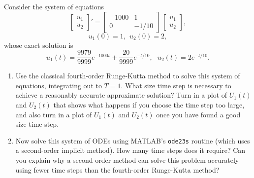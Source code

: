 \documentclass[10pt]{article}
\begin{document}
\begin{problem}[Problem 5]
Consider the system of equations
\[
\left[ \begin{array}{c} u_1 \\ u_2 \end{array} \right]' =
\left[ \begin{array}{cc} -1000 & 1 \\ 0 & -1/10 \end{array} \right]~
\left[ \begin{array}{c} u_1 \\ u_2 \end{array} \right] ,
\]
\[
u_1 (0) = 1 ,~~u_2 (0) = 2 ,
\]
whose exact solution is
\[
u_1(t) = \frac{9979}{9999} e^{-1000t} + \frac{20}{9999} e^{-t/10} ,~~~u_2 (t) = 2 e^{-t/10} .
\]
\begin{enumerate}[label=(\alph*)]
\item Use the classical fourth-order Runge-Kutta method to solve this system of equations, integrating out to \(T=1\).  What size time step is necessary to achieve a reasonably accurate approximate solution?
Turn in a plot of \(U_1 (t)\) and \(U_2 (t)\) that shows what happens if you choose the time step too large, and also turn in a plot of \(U_1 (t)\) and \(U_2 (t)\) once you have found a good size time step.
\item Now solve this system of ODEs using MATLAB's \verb+ode23s+ routine (which uses a second-order implicit method).  How many time steps does it require?  Can you explain why a second-order method can solve this problem accurately using fewer time steps than the fourth-order Runge-Kutta method?
\end{enumerate}
\end{problem}
\end{document}
